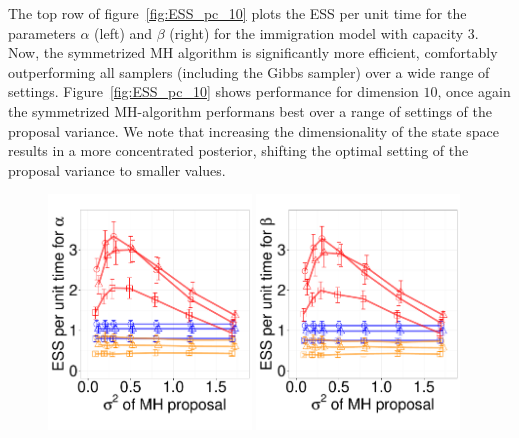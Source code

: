 { The top row of figure~\ref{fig:ESS_pc_10} plots the ESS per unit time for the 
 parameters $\alpha$ (left) and $\beta$ (right) for the immigration model with 
 capacity $3$.  Now, the symmetrized MH algorithm is significantly 
 more efficient, comfortably outperforming all samplers (including the Gibbs 
 sampler) over a wide range of settings. %
 Figure~\ref{fig:ESS_pc_10} shows performance for dimension
 $10$, once again the symmetrized MH-algorithm performans best over a 
 range of settings of the proposal variance. We note that increasing the
 dimensionality of the state space results in a more concentrated posterior,
 shifting the optimal setting of the proposal variance to smaller values.
  \begin{figure}%
  \centering
  \begin{minipage}[!hp]{0.8\linewidth}
  \centering
    \includegraphics [width=0.48\textwidth, angle=0]{figures_new_apr12/CQ_alpha_dim3_18apr12.pdf}
    \includegraphics [width=0.48\textwidth, angle=0]{figures_new_apr12/CQ_beta_dim3_18apr12.pdf}

\end{minipage}
\end{figure}}
